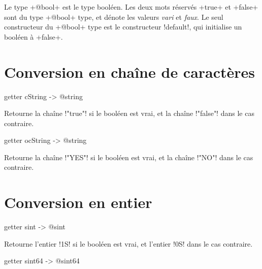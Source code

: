 

Le type \ggs+@bool+ est le type booléen. Les deux mots réservés \ggs+true+ et \ggs+false+ sont du type \ggs+@bool+ type, et dénote les valeurs \emph{vari} et \emph{faux}. Le seul constructeur du \ggs+@bool+ type est le constructeur \ggs!default!, qui initialise un booléen à \ggs+false+.


\section{Conversion en chaîne de caractères}


\begin{galgasbox}
getter cString -> @string
\end{galgasbox}

Retourne la chaîne \ggs!"true"! si le booléen est vrai, et la chaîne \ggs!"false"! dans le cas contraire.








\begin{galgasbox}
getter ocString -> @string
\end{galgasbox}

Retourne la chaîne \ggs!"YES"! si le booléen est vrai, et la chaîne \ggs!"NO"! dans le cas contraire.




\section{Conversion en entier}



\begin{galgasbox}
getter sint -> @sint
\end{galgasbox}

Retourne l'entier \ggs!1S! si le booléen est vrai, et l'entier \ggs!0S! dans le cas contraire.





\begin{galgasbox}
getter sint64 -> @sint64
\end{galgasbox}


